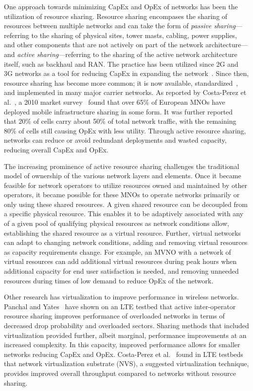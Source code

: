 \documentclass[12pt,dvipsnames]{report}
\begin{document}
One approach towards minimizing CapEx and OpEx of networks has been the utilization of resource sharing.  Resource sharing encompases the sharing of resources between multiple networks and can take the form of \emph{passive sharing}---referring to the sharing of physical sites, tower masts, cabling, power supplies, and other components that are not actively on part of the network architecture---and \emph{active sharing}---referring to the sharing of the active network architecture itself, such as backhaul and RAN.  The practice has been utilized since 2G and 3G networks as a tool for reducing CapEx in expanding the network~\cite{1421931}.  Since then, resource sharing has become more common; it is now available, standardized~\cite{3GPP_TS_23.251}, and implemented in many major carrier networks.  As reported by Costa-Perez et al.~\cite{6553675}, a 2010 market survey~\cite{NetSharingReport} found that over 65\% of European MNOs have deployed mobile infrastructure sharing in some form.  It was further reported~\cite{6553675} that 20\% of cells carry about 50\% of total network traffic, with the remaining 80\% of cells still causing OpEx with less utility.  Through active resource sharing, networks can reduce or avoid redundant deployments and wasted capacity, reducing overall CapEx and OpEx.

The increasing prominence of active resource sharing challenges the traditional model of ownership of the various network layers and elements.  Once it became feasible for network operators to utilize resources owned and maintained by other operators, it became possible for these MNOs to operate networks primarily or only using these shared resources.  A given shared resource can be decoupled from a specific physical resource.  This enables it to be adaptively associated with any of a given pool of qualifying physical resources as network conditions allow, establishing the shared resource as a virtual resource.  Further, virtual networks can adapt to changing network conditions, adding and removing virtual resources as capacity requirements change.  For example, an MVNO with a network of virtual resources can add additional virtual resources during peak hours when additional capacity for end user satisfaction is needed, and removing unneeded resources during times of low demand to reduce OpEx of the network.

Other research has virtualization to improve performance in wireless networks.  Panchal and Yates~\cite{6571315} have shown on an LTE testbed that active inter-operator resource sharing improves performance of overloaded networks in terms of decreased drop probability and overloaded sectors.  Sharing methods that included virtualization provided further, albeit marginal, performance improvements at an increased complexity.  In this capacity, improved performance allows for smaller networks reducing CapEx and OpEx.  Costa-Perez et al.~\cite{6553675} found in LTE testbeds that network virtualization substrate (NVS), a suggested virtualization technique, provides improved overall throughput compared to networks without resource sharing.
\end{document}
